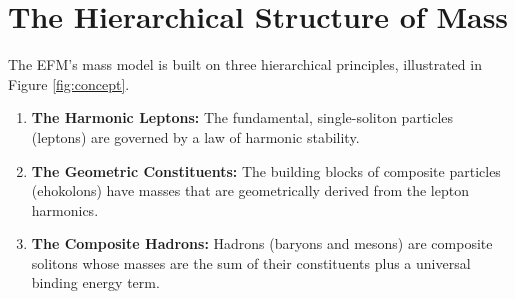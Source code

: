\documentclass[11pt, twoside]{article}
\begin{document}
\section{The Hierarchical Structure of Mass}
The EFM's mass model is built on three hierarchical principles, illustrated in Figure \ref{fig:concept}.
\begin{enumerate}
    \item \textbf{The Harmonic Leptons:} The fundamental, single-soliton particles (leptons) are governed by a law of harmonic stability.
    \item \textbf{The Geometric Constituents:} The building blocks of composite particles (ehokolons) have masses that are geometrically derived from the lepton harmonics.
    \item \textbf{The Composite Hadrons:} Hadrons (baryons and mesons) are composite solitons whose masses are the sum of their constituents plus a universal binding energy term.
\end{enumerate}
\end{document}
